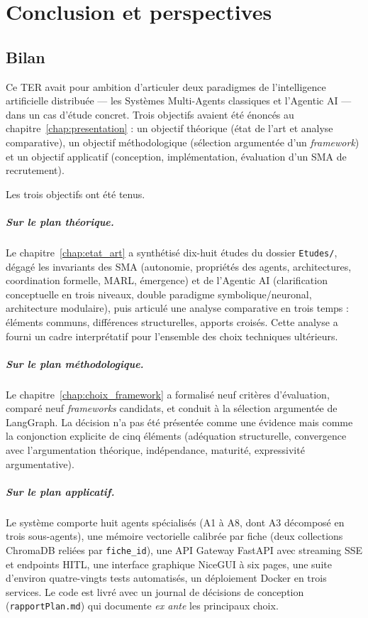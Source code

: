 \chapter{Conclusion et perspectives}
\label{chap:conclusion}

\section{Bilan}

Ce TER avait pour ambition d'articuler deux paradigmes de l'intelligence artificielle distribuée — les Systèmes Multi-Agents classiques et l'Agentic AI — dans un cas d'étude concret. Trois objectifs avaient été énoncés au chapitre~\ref{chap:presentation} : un objectif théorique (état de l'art et analyse comparative), un objectif méthodologique (sélection argumentée d'un \emph{framework}) et un objectif applicatif (conception, implémentation, évaluation d'un SMA de recrutement).

Les trois objectifs ont été tenus.

\paragraph{Sur le plan théorique.}
Le chapitre~\ref{chap:etat_art} a synthétisé dix-huit études du dossier \texttt{Etudes/}, dégagé les invariants des SMA (autonomie, propriétés des agents, architectures, coordination formelle, MARL, émergence) et de l'Agentic AI (clarification conceptuelle en trois niveaux, double paradigme symbolique/neuronal, architecture modulaire), puis articulé une analyse comparative en trois temps : éléments communs, différences structurelles, apports croisés. Cette analyse a fourni un cadre interprétatif pour l'ensemble des choix techniques ultérieurs.

\paragraph{Sur le plan méthodologique.}
Le chapitre~\ref{chap:choix_framework} a formalisé neuf critères d'évaluation, comparé neuf \emph{frameworks} candidats, et conduit à la sélection argumentée de LangGraph. La décision n'a pas été présentée comme une évidence mais comme la conjonction explicite de cinq éléments (adéquation structurelle, convergence avec l'argumentation théorique, indépendance, maturité, expressivité argumentative).

\paragraph{Sur le plan applicatif.}
Le système comporte huit agents spécialisés (A1 à A8, dont A3 décomposé en trois sous-agents), une mémoire vectorielle calibrée par fiche (deux collections ChromaDB reliées par \texttt{fiche\_id}), une API Gateway FastAPI avec streaming SSE et endpoints HITL, une interface graphique NiceGUI à six pages, une suite d'environ quatre-vingts tests automatisés, un déploiement Docker en trois services. Le code est livré avec un journal de décisions de conception (\texttt{rapportPlan.md}) qui documente \emph{ex ante} les principaux choix.

